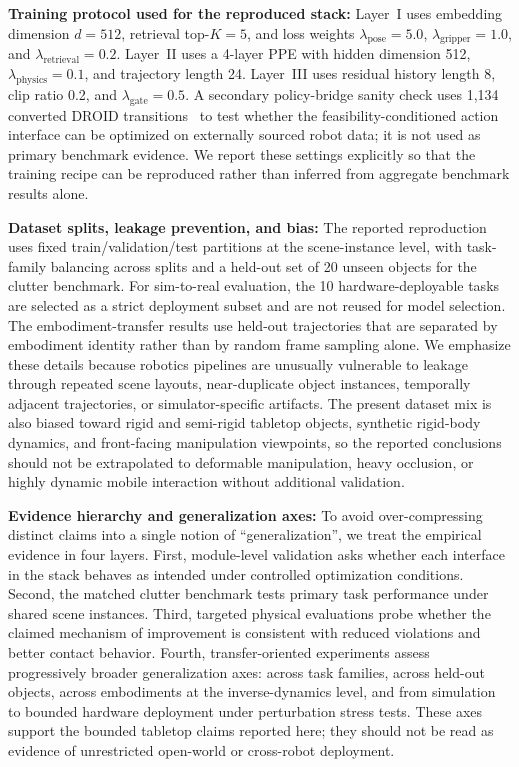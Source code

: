 \documentclass[12pt]{article}
\begin{document}
\textbf{Training protocol used for the reproduced stack:} Layer~I uses embedding dimension $d=512$, retrieval top-$K=5$, and loss weights $\lambda_{\mathrm{pose}}=5.0$, $\lambda_{\mathrm{gripper}}=1.0$, and $\lambda_{\mathrm{retrieval}}=0.2$. Layer~II uses a 4-layer PPE with hidden dimension 512, $\lambda_{\mathrm{physics}}=0.1$, and trajectory length 24. Layer~III uses residual history length 8, clip ratio 0.2, and $\lambda_{\mathrm{gate}}=0.5$. A secondary policy-bridge sanity check uses 1,134 converted DROID transitions~\cite{khazatsky2024droid} to test whether the feasibility-conditioned action interface can be optimized on externally sourced robot data; it is not used as primary benchmark evidence. We report these settings explicitly so that the training recipe can be reproduced rather than inferred from aggregate benchmark results alone.

\textbf{Dataset splits, leakage prevention, and bias:} The reported reproduction uses fixed train/validation/test partitions at the scene-instance level, with task-family balancing across splits and a held-out set of 20 unseen objects for the clutter benchmark. For sim-to-real evaluation, the 10 hardware-deployable tasks are selected as a strict deployment subset and are not reused for model selection. The embodiment-transfer results use held-out trajectories that are separated by embodiment identity rather than by random frame sampling alone. We emphasize these details because robotics pipelines are unusually vulnerable to leakage through repeated scene layouts, near-duplicate object instances, temporally adjacent trajectories, or simulator-specific artifacts. The present dataset mix is also biased toward rigid and semi-rigid tabletop objects, synthetic rigid-body dynamics, and front-facing manipulation viewpoints, so the reported conclusions should not be extrapolated to deformable manipulation, heavy occlusion, or highly dynamic mobile interaction without additional validation.

\textbf{Evidence hierarchy and generalization axes:} To avoid over-compressing distinct claims into a single notion of ``generalization'', we treat the empirical evidence in four layers. First, module-level validation asks whether each interface in the stack behaves as intended under controlled optimization conditions. Second, the matched clutter benchmark tests primary task performance under shared scene instances. Third, targeted physical evaluations probe whether the claimed mechanism of improvement is consistent with reduced violations and better contact behavior. Fourth, transfer-oriented experiments assess progressively broader generalization axes: across task families, across held-out objects, across embodiments at the inverse-dynamics level, and from simulation to bounded hardware deployment under perturbation stress tests. These axes support the bounded tabletop claims reported here; they should not be read as evidence of unrestricted open-world or cross-robot deployment.
\end{document}
